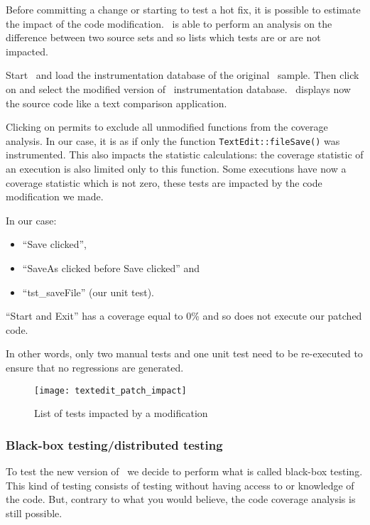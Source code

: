 Before committing a change or starting to test a hot fix, it is possible to
estimate the impact of the code modification. \CoverageBrowser\ is able
to perform an analysis on the difference between two source sets and so lists
which tests are or are not impacted.

Start \CoverageBrowser\ and load the instrumentation database of the  original
\TextEdit\ sample. Then click on  and
select the modified version of \TextEdit\ instrumentation database.
\CoverageBrowser\ displays  now the source code like a text comparison
application.

Clicking on  permits to exclude
all unmodified functions from the coverage analysis. In our case, it is as if
only the function \verb$TextEdit::fileSave()$ was instrumented. 
This also impacts the statistic calculations: the coverage statistic of an
execution is also limited only to this function. Some executions have now a
coverage statistic which is not zero, these tests are impacted by the code
modification we made. 

In our case:
\begin{itemize}
  \item ``Save clicked'',
  \item ``SaveAs clicked before Save clicked'' and 
  \item ``tst\_saveFile'' (our unit test).
\end{itemize}

``Start and Exit'' has a coverage equal to 0\% and so does not execute our
patched code.

In other words, only two manual tests and one unit test need to be re-executed
to ensure that no regressions are generated.

\begin{figure}[H]
  \begin{center}
    \texttt{[image: textedit\_patch\_impact]}
  \end{center}
  \caption{List of tests impacted by a modification}
  \label{fig:patchimpact}
\end{figure}

\subsubsection{Black-box testing/distributed testing}

To test the new version of \TextEdit\ we decide to perform what is called  black-box testing.
This kind of testing consists of testing without having access to or knowledge of the code. But, contrary to what you would believe,
the code coverage analysis is still possible. 

